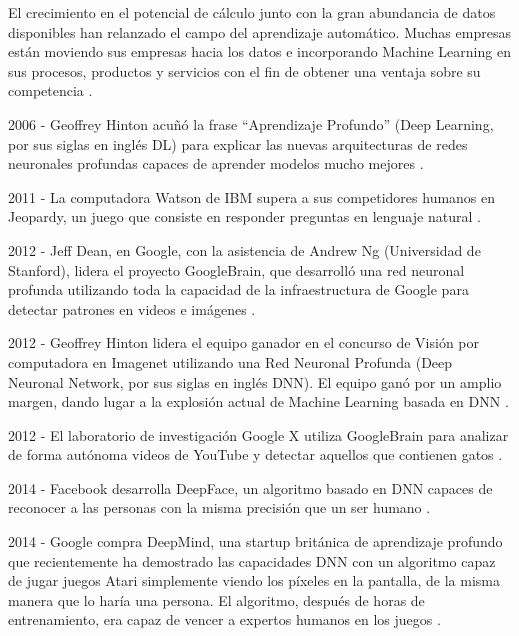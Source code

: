 El crecimiento en el potencial de cálculo junto con la gran abundancia de datos disponibles han relanzado el campo del aprendizaje automático. Muchas empresas están moviendo sus empresas hacia los datos e incorporando Machine Learning en sus procesos, productos y servicios con el fin de obtener una ventaja sobre su competencia \cite{V.Gonzalez}.
\\ \par
2006 - Geoffrey Hinton acuñó la frase ``Aprendizaje Profundo'' (Deep Learning, por sus siglas en inglés DL) para explicar las nuevas arquitecturas de redes neuronales profundas capaces de aprender modelos mucho mejores \cite{V.Gonzalez}.
\\ \par
2011 - La computadora Watson de IBM supera a sus competidores humanos en Jeopardy, un juego que consiste en responder preguntas en lenguaje natural \cite{V.Gonzalez}.
\\ \par
2012 - Jeff Dean, en Google, con la asistencia de Andrew Ng (Universidad de Stanford), lidera el proyecto GoogleBrain, que desarrolló una red neuronal profunda utilizando toda la capacidad de la infraestructura de Google para detectar patrones en videos e imágenes \cite{V.Gonzalez}.
\\ \par
2012 - Geoffrey Hinton lidera el equipo ganador en el concurso de Visión por computadora en Imagenet utilizando una Red Neuronal Profunda (Deep Neuronal Network, por sus siglas en inglés DNN). El equipo ganó por un amplio margen, dando lugar a la explosión actual de Machine Learning basada en DNN \cite{V.Gonzalez}.
\\ \par
2012 - El laboratorio de investigación Google X utiliza GoogleBrain para analizar de forma autónoma videos de YouTube y detectar aquellos que contienen gatos \cite{V.Gonzalez}.
\\ \par
2014 - Facebook desarrolla DeepFace, un algoritmo basado en DNN capaces de reconocer a las personas con la misma precisión que un ser humano \cite{V.Gonzalez}.
\\ \par
2014 - Google compra DeepMind, una startup británica de aprendizaje profundo que recientemente ha demostrado las capacidades DNN con un algoritmo capaz de jugar juegos Atari simplemente viendo los píxeles en la pantalla, de la misma manera que lo haría una persona. El algoritmo, después de horas de entrenamiento, era capaz de vencer a expertos humanos en los juegos \cite{V.Gonzalez}.

